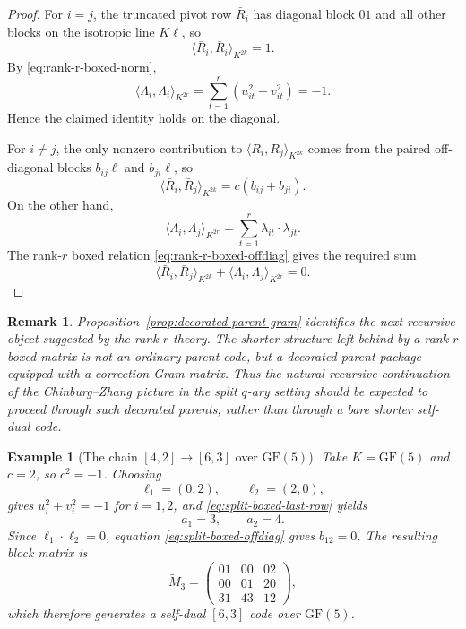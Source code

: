 \documentclass[12pt]{article}
\newtheorem{example}[theorem]{Example}
\newtheorem{remark}[theorem]{Remark}
\newcommand{\GF}[1]{\ensuremath{\mathrm{GF}(#1)}}
\begin{document}
\begin{proof}
For \(i=j\), the truncated pivot row \(\bar R_i\) has diagonal block \(01\) and all other blocks on the isotropic line \(K\ell\), so
\[
\langle \bar R_i,\bar R_i\rangle_{K^{2k}}=1.
\]
By \eqref{eq:rank-r-boxed-norm},
\[
\langle \Lambda_i,\Lambda_i\rangle_{K^{2r}}
=\sum_{t=1}^r (u_{it}^2+v_{it}^2)=-1.
\]
Hence the claimed identity holds on the diagonal.

For \(i\neq j\), the only nonzero contribution to \(\langle \bar R_i,\bar R_j\rangle_{K^{2k}}\) comes from the paired off-diagonal blocks \(b_{ij}\ell\) and \(b_{ji}\ell\), so
\[
\langle \bar R_i,\bar R_j\rangle_{K^{2k}}=c(b_{ij}+b_{ji}).
\]
On the other hand,
\[
\langle \Lambda_i,\Lambda_j\rangle_{K^{2r}}
=\sum_{t=1}^r \lambda_{it}\cdot\lambda_{jt}.
\]
The rank-\(r\) boxed relation \eqref{eq:rank-r-boxed-offdiag} gives the required sum
\[
\langle \bar R_i,\bar R_j\rangle_{K^{2k}}+
\langle \Lambda_i,\Lambda_j\rangle_{K^{2r}}=0.
\]
\end{proof}

\begin{remark}
\rm
Proposition~\ref{prop:decorated-parent-gram} identifies the next recursive object suggested by the rank-\(r\) theory. The shorter structure left behind by a rank-\(r\) boxed matrix is not an ordinary parent code, but a decorated parent package equipped with a correction Gram matrix. Thus the natural recursive continuation of the Chinburg--Zhang picture in the split \(q\)-ary setting should be expected to proceed through such decorated parents, rather than through a bare shorter self-dual code.
\end{remark}

\begin{example}[The chain \texorpdfstring{$[4,2]\to[6,3]$}{[4,2] to [6,3]} over \texorpdfstring{$\GF{5}$}{GF(5)}]
\label{ex:split-boxed-63}
Take \(K=\GF{5}\) and \(c=2\), so \(c^2=-1\). Choosing
\[
\ell_1=(0,2),\qquad \ell_2=(2,0),
\]
gives \(u_i^2+v_i^2=-1\) for \(i=1,2\), and \eqref{eq:split-boxed-last-row} yields
\[
a_1=3,\qquad a_2=4.
\]
Since \(\ell_1\cdot\ell_2=0\), equation \eqref{eq:split-boxed-offdiag} gives \(b_{12}=0\). The resulting block matrix is
\[
\widetilde M_3=
\begin{pmatrix}
01 & 00 & 02\\
00 & 01 & 20\\
31 & 43 & 12
\end{pmatrix},
\]
which therefore generates a self-dual \([6,3]\) code over \(\GF{5}\).
\end{example}
\end{document}
